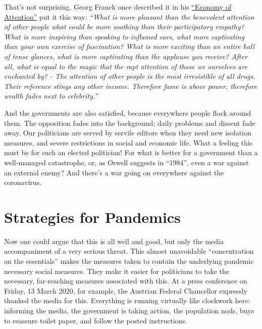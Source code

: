 \documentclass[%
 reprint,
 showpacs,
 showkeys,
 preprintnumbers,
 amsmath,amssymb,
 aps,
  pra,
  longbibliography,
 floatfix,
 ]{revtex4-1}
\begin{document}
That's not surprising. Georg Franck once described it in his
\href{http://www.iemar.tuwien.ac.at/publications/Franck_1993a.pdf}{``Economy of Attention''} put it this way:
{\em
``What is more pleasant than the benevolent attention of other people
what could be more soothing than their participatory empathy? What is more inspiring than speaking to inflamed ears, what more captivating than your own exercise of fascination? What is more exciting than an entire hall of tense glances, what is more captivating than the applause you receive?
After all, what is equal to the magic that the rapt attention
of those we ourselves are enchanted by? - The attention
of other people is the most irresistible of all drugs. Their reference stings
any other income. Therefore fame is above power, therefore wealth fades next to celebrity.''}

And the governments are also satisfied, because everywhere people flock around them. The opposition fades into the background;
daily problems and dissent fade away.
Our politicians are served by servile editors when they need new isolation measures,
and severe restrictions in social and economic life.
What a feeling this must be for such an elected politician!
For what is better for a government than a well-managed catastrophe, or, as Orwell suggests in ``1984'', even a war
against an external enemy?
And there's a war going on everywhere against the coronavirus.

\section{Strategies for Pandemics}

Now one could argue that this is all well and good, but only the media accompaniment of a very serious threat.
This almost unavoidable ``concentration on the essentials'' makes the measures taken to contain the underlying pandemic
necessary social measures.
They make it easier for politicians to take the necessary, far-reaching measures associated with this.
At a press conference on Friday, 13 March 2020, for example, the Austrian Federal Chancellor expressly thanked the media for this.
Everything is running virtually like clockwork here: informing the media, the government is taking action, the population nods, buys to reassure
toilet paper, and follow the posted instructions.
\end{document}
